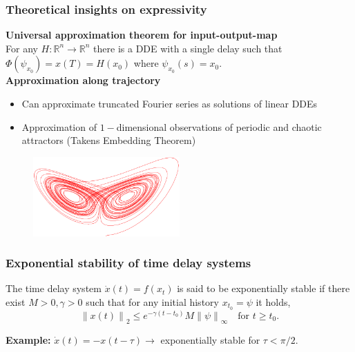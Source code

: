 \documentclass[11pt,aspectratio=169]{beamer}
\newcommand{\norm}[1]{\left\lVert#1\right\rVert}
\newcommand{\R}{\mathbb{R}}
\begin{document}

\begin{frame}[t]
    \frametitle{Theoretical insights on expressivity}
    \textbf{Universal approximation theorem for input-output-map}\\\vspace{0.1cm}
    For any $H:\R^n \to\R^n$ there is a DDE with a single delay such that $\Phi(\psi_{x_0}) = x(T) = H(x_0)$ where $\psi_{x_0}(s)=x_0$.\\
    \vspace{0.25cm}
    \textbf{Approximation along trajectory}
    \begin{itemize}
        \item Can approximate truncated Fourier series as solutions of linear DDEs
        \item Approximation of $1-$dimensional observations of periodic and chaotic attractors (Takens Embedding Theorem)
     \end{itemize}
     \begin{figure}
                \centering
                \includegraphics[width=0.5\textwidth]{figures/lorenz.png}
            \end{figure}
\end{frame}


\begin{frame}[t]
    \frametitle{Exponential stability of time delay systems}
    \begin{definition}
    The time delay system $\dot{x}(t) = f(x_t)$ is said to be exponentially stable if there exist $M>0, \gamma>0$ such that for any initial history $x_{t_0} = \psi$ it holds,
    $$\norm{x(t)}_2 \leq e^{-\gamma (t-t_0)}M\norm{\psi}_\infty \quad \text{for } t\geq t_0.$$
    \end{definition}
    \textbf{Example: } $\dot{x}(t) = -x(t-\tau) \to$ exponentially stable for $\tau<\pi/2$.
\end{frame}
\end{document}
